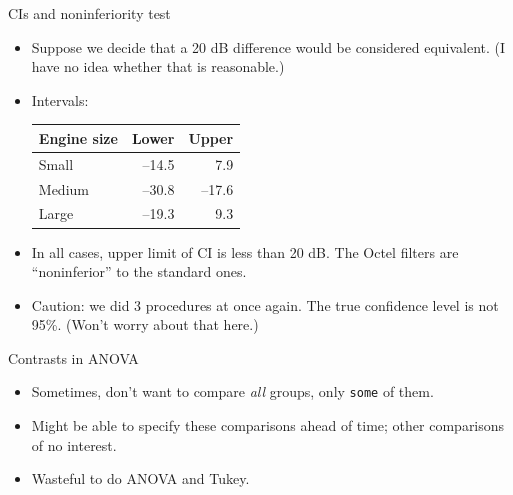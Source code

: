 \begin{frame}[fragile]{CIs and noninferiority test}
  
  \begin{itemize}
  \item Suppose we decide that a 20 dB difference would be considered
    equivalent. (I have no idea whether that is reasonable.)
    
  \item Intervals: \vspace{2ex}
    
    \begin{tabular}{lrr}
      Engine size & Lower & Upper \\
      \hline
      Small & --14.5 &7.9 \\
      Medium & --30.8 &--17.6\\
      Large & --19.3&9.3\\
      \hline
    \end{tabular} \vspace{2ex}

  \item In all cases, upper limit of CI is less than 20 dB. The Octel
    filters are ``noninferior'' to the standard ones.
  \item Caution: we did 3 procedures at once again. The true
    confidence level is not 95\%. (Won't worry about that here.)
  \end{itemize}
  
\end{frame}

\begin{frame}[fragile]{Contrasts in ANOVA}
  
  \begin{itemize}
  \item Sometimes, don't want to compare \emph{all} groups, only
    \texttt{some} of them.
  \item Might be able to specify these comparisons ahead of time;
    other comparisons of no interest.
  \item Wasteful to do ANOVA and Tukey.
  \end{itemize}
  
\end{frame}

